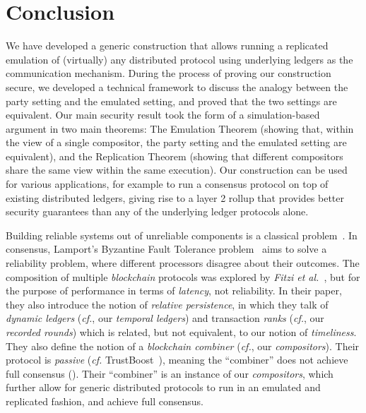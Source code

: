 \section{Conclusion}

\myparagraph[Summary]
We have developed a generic construction that allows running a replicated emulation
of (virtually) any distributed protocol using underlying ledgers as the communication
mechanism. During the process of proving our construction secure, we developed a
technical framework to discuss the analogy between the party setting and the emulated
setting, and proved that the two settings are equivalent.
Our main security result took the form of a simulation-based argument in two main theorems:
The Emulation Theorem (showing that, within the view of a single compositor, the party
setting and the emulated setting are equivalent), and the Replication Theorem (showing that
different compositors share the same view within the same execution). Our construction
can be used for various applications, for example to run a consensus protocol on top
of existing distributed ledgers, giving rise to a layer 2 rollup that provides better
security guarantees than any of the underlying ledger protocols alone.

Building reliable systems out of unreliable components
is a classical problem~\cite{von1956probabilistic,moore1956reliable}.
In consensus, Lamport's Byzantine Fault Tolerance problem~\cite{shostak1982byzantine}
aims to solve a reliability problem, where different processors disagree about their
outcomes. The composition of multiple \emph{blockchain} protocols was explored by
\emph{Fitzi et al.}~\cite{combiners}, but for the purpose of performance in terms of
\emph{latency}, not reliability. In their paper, they also introduce the notion of
\emph{relative persistence}, in which they talk of \emph{dynamic ledgers} (\emph{cf.}, our
\emph{temporal ledgers}) and transaction \emph{ranks} (\emph{cf.}, our \emph{recorded rounds})
which is related, but not equivalent, to our notion of \emph{timeliness}.
They also define the notion of a \emph{blockchain combiner} (\emph{cf.}, our \emph{compositors}).
Their protocol is \emph{passive} (\emph{cf.} TrustBoost~\cite{trustboost}),
meaning the ``combiner'' does not achieve full consensus (\cite[Section 5]{combiners}).
Their ``combiner'' is an instance of our \emph{compositors}, which
further allow for generic distributed protocols to run in an emulated and
replicated fashion, and achieve full consensus.

